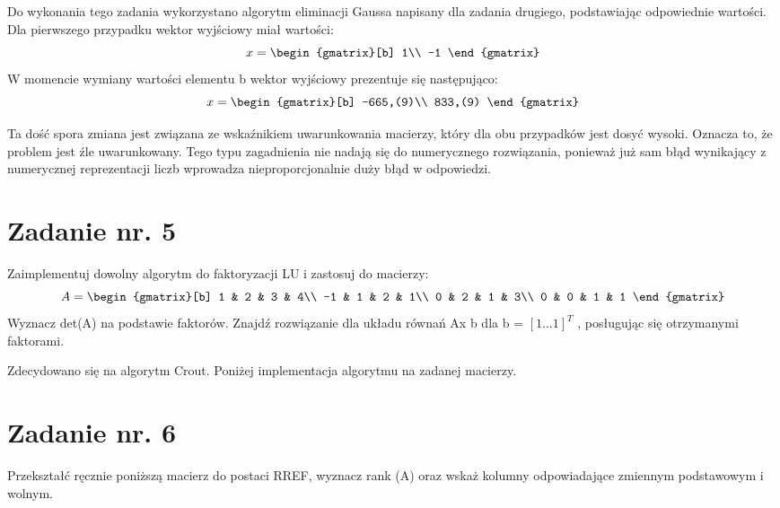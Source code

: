 \documentclass{article}
\begin{document}
  Do wykonania tego zadania wykorzystano algorytm eliminacji Gaussa napisany dla zadania drugiego, podstawiając odpowiednie wartości.
Dla pierwszego przypadku wektor wyjściowy miał wartości:
\begin{equation}
  x =
  \begin{gmatrix}[b]
    1\\
    -1
  \end{gmatrix}
\end{equation}
  W momencie wymiany wartości elementu b wektor wyjściowy prezentuje się następująco:
  \begin{equation}
    x =
    \begin{gmatrix}[b]
      -665,(9)\\
      833,(9)
    \end{gmatrix}
  \end{equation}

Ta dość spora zmiana jest związana ze wskaźnikiem uwarunkowania macierzy, który dla obu przypadków jest dosyć wysoki. Oznacza to, że problem jest źle uwarunkowany. Tego typu zagadnienia nie nadają się do numerycznego rozwiązania, ponieważ już sam błąd wynikający z numerycznej reprezentacji liczb wprowadza nieproporcjonalnie duży błąd w odpowiedzi.

\section{Zadanie nr. 5}
Zaimplementuj dowolny algorytm do faktoryzacji LU i zastosuj do macierzy:
\begin{equation}
  A=
  \begin{gmatrix}[b]
    1 & 2 & 3 & 4\\
    -1 & 1 & 2 & 1\\
    0 & 2 & 1 & 3\\
    0 & 0 & 1 & 1
  \end{gmatrix}
\end{equation}
Wyznacz det(A) na podstawie faktorów. Znajdź rozwiązanie dla układu równań Ax b dla b = $[1...1]^{T}$ , posługując się otrzymanymi faktorami.

Zdecydowano się na algorytm Crout. Poniżej implementacja algorytmu na zadanej macierzy.\\

\section{Zadanie nr. 6}
Przekształć ręcznie poniższą macierz do postaci RREF, wyznacz rank (A) oraz
wskaż kolumny odpowiadające zmiennym podstawowym i wolnym.
\end{document}
